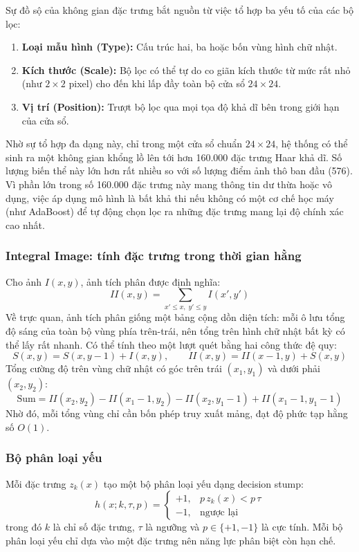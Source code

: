 Sự đồ sộ của không gian đặc trưng bắt nguồn từ việc tổ hợp ba yếu tố của các bộ lọc:
\begin{enumerate}
  \item \textbf{Loại mẫu hình (Type):} Cấu trúc hai, ba hoặc bốn vùng hình chữ nhật.
  \item \textbf{Kích thước (Scale):} Bộ lọc có thể tự do co giãn kích thước từ mức rất nhỏ (như $2 \times 2$ pixel) cho đến khi lấp đầy toàn bộ cửa sổ $24 \times 24$.
  \item \textbf{Vị trí (Position):} Trượt bộ lọc qua mọi tọa độ khả dĩ bên trong giới hạn của cửa sổ.
\end{enumerate}

Nhờ sự tổ hợp đa dạng này, chỉ trong một cửa sổ chuẩn $24 \times 24$, hệ thống có thể sinh ra một không gian khổng lồ lên tới hơn 160.000 đặc trưng Haar khả dĩ. Số lượng biến thể này lớn hơn rất nhiều so với số lượng điểm ảnh thô ban đầu (576). Vì phần lớn trong số 160.000 đặc trưng này mang thông tin dư thừa hoặc vô dụng, việc áp dụng mô hình là bất khả thi nếu không có một cơ chế học máy (như AdaBoost) để tự động chọn lọc ra những đặc trưng mang lại độ chính xác cao nhất. \cite{viola2001rapid,viola2004robust}

\subsubsection{Integral Image: tính đặc trưng trong thời gian hằng}

Cho ảnh $I(x,y)$, ảnh tích phân được định nghĩa:
\[
II(x,y)=\sum_{x' \le x,\; y' \le y} I(x',y')
\]
Về trực quan, ảnh tích phân giống một bảng cộng dồn diện tích: mỗi ô lưu tổng độ sáng của toàn bộ vùng phía trên-trái, nên tổng trên hình chữ nhật bất kỳ có thể lấy rất nhanh.
Có thể tính theo một lượt quét bằng hai công thức đệ quy:
\[
S(x,y)=S(x,y-1)+I(x,y),\qquad
II(x,y)=II(x-1,y)+S(x,y)
\]
Tổng cường độ trên vùng chữ nhật có góc trên trái $(x_1,y_1)$ và dưới phải $(x_2,y_2)$:
\[
\mathrm{Sum}=
II(x_2,y_2)-II(x_1-1,y_2)-II(x_2,y_1-1)+II(x_1-1,y_1-1)
\]
Nhờ đó, mỗi tổng vùng chỉ cần bốn phép truy xuất mảng, đạt độ phức tạp hằng số $O(1)$.  \cite{viola2001rapid}

\subsubsection{Bộ phân loại yếu}

Mỗi đặc trưng $z_k(x)$ tạo một bộ phân loại yếu dạng decision stump:
\[
h(x;k,\tau,p)=
\begin{cases}
+1, & p\,z_k(x) < p\,\tau \\
-1, & \text{ngược lại}
\end{cases}
\]
trong đó $k$ là chỉ số đặc trưng, $\tau$ là ngưỡng và $p \in \{+1,-1\}$ là cực tính.
Mỗi bộ phân loại yếu chỉ dựa vào một đặc trưng nên năng lực phân biệt còn hạn chế.

